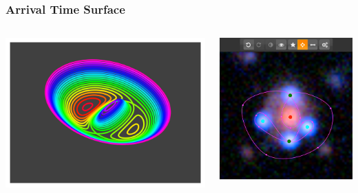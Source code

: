\documentclass[aspectratio=1610]{beamer}
\begin{document}
\begin{frame}
  \frametitle{Arrival Time Surface}
  \begin{columns}[c]
  	\begin{column}{0.45\textwidth}
	  	\includegraphics[width=\textwidth]{imgs/arriv_2}
  	\end{column}
  	\begin{column}{0.45\textwidth}
	  	\includegraphics[width=\textwidth]{imgs/screenshot}
  	\end{column}
  \end{columns}
\end{frame}
\end{document}
